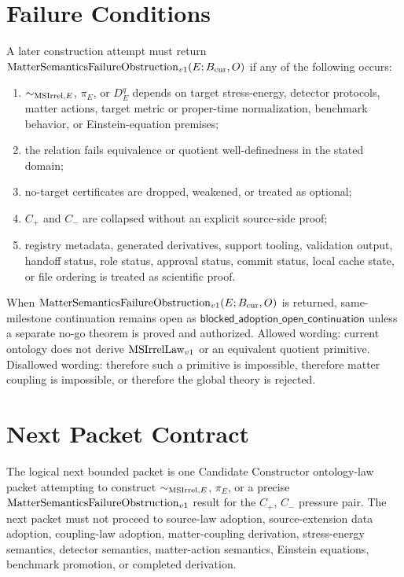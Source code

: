 \section{Failure Conditions}

A later construction attempt must return \(\mathrm{MatterSemanticsFailureObstruction}_{v1}(E;B_{\mathrm{cur}},O)\) if any of the
following occurs:
\begin{enumerate}
  \item \(\sim_{\mathrm{MSIrrel},E}\), \(\pi_E\), or \(D^q_E\) depends on target
    stress-energy, detector protocols, matter actions, target metric or
    proper-time normalization, benchmark behavior, or Einstein-equation
    premises;
  \item the relation fails equivalence or quotient well-definedness in the
    stated domain;
  \item no-target certificates are dropped, weakened, or treated as optional;
  \item \(C_+\) and \(C_-\) are collapsed without an explicit source-side
    proof;
  \item registry metadata, generated derivatives, support tooling,
    validation output, handoff status, role status, approval status, commit
    status, local cache state, or file ordering is treated as scientific
    proof.
\end{enumerate}

When \(\mathrm{MatterSemanticsFailureObstruction}_{v1}(E;B_{\mathrm{cur}},O)\) is returned, same-milestone continuation remains
open as \(\mathsf{blocked\_adoption\_open\_continuation}\) unless a separate
no-go theorem is proved and authorized.  Allowed wording: current ontology
does not derive \(\mathrm{MSIrrelLaw}_{v1}\) or an equivalent quotient primitive.
Disallowed wording: therefore such a primitive is impossible, therefore
matter coupling is impossible, or therefore the global theory is rejected.

\section{Next Packet Contract}

The logical next bounded packet is one Candidate Constructor ontology-law
packet attempting to construct \(\sim_{\mathrm{MSIrrel},E}\), \(\pi_E\), or a precise
\(\mathrm{MatterSemanticsFailureObstruction}_{v1}\) result for the \(C_+\), \(C_-\) pressure pair.  The next packet
must not proceed to source-law adoption, source-extension data adoption,
coupling-law adoption, matter-coupling derivation, stress-energy semantics,
detector semantics, matter-action semantics, Einstein equations, benchmark
promotion, or completed derivation.

